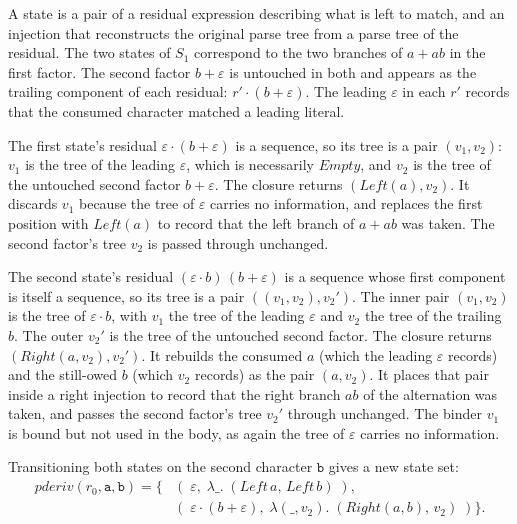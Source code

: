 A state is a pair of a residual expression describing what is left to match,
and an injection that reconstructs the original parse tree 
from a parse tree of the residual.
The two states of $S_1$ correspond to the two branches 
of $a + ab$ in the first factor. 
The second factor $b + \varepsilon$ is untouched in both 
and appears as the trailing component of each residual: $r' \cdot (b + \varepsilon)$.
The leading $\varepsilon$ in each $r'$ records  
that the consumed character matched a leading literal.

The first state's residual $\varepsilon \cdot (b + \varepsilon)$ is a sequence, 
so its tree is a pair $(v_1, v_2)$: 
$v_1$ is the tree of the leading $\varepsilon$, 
which is necessarily $\mathit{Empty}$, 
and $v_2$ is the tree of the untouched second factor $b + \varepsilon$. 
The closure returns $(\mathit{Left}(a), v_2)$. 
It discards $v_1$ because the tree of $\varepsilon$ carries no information, 
and replaces the first position with $\mathit{Left}(a)$ 
to record that the left branch of $a + ab$ was taken. 
The second factor's tree $v_2$ is passed through unchanged.

The second state's residual $(\varepsilon \cdot b)\,(b + \varepsilon)$
is a sequence whose first component is itself a sequence, 
so its tree is a pair $((v_1, v_2), v_2')$. 
The inner pair $(v_1, v_2)$ is the tree of $\varepsilon \cdot b$, 
with $v_1$ the tree of the leading $\varepsilon$ 
and $v_2$ the tree of the trailing $b$. 
The outer $v_2'$ is the tree of the untouched second factor. 
The closure returns $(\mathit{Right}(a, v_2), v_2')$. 
It rebuilds the consumed $a$ (which the leading $\varepsilon$ records) 
and the still-owed $b$ (which $v_2$ records) as the pair $(a, v_2)$.
It places that pair inside a right injection to record 
that the right branch $ab$ of the alternation was taken, 
and passes the second factor's tree $v_2'$ through unchanged. 
The binder $v_1$ is bound but not used in the body, 
as again the tree of $\varepsilon$ carries no information.

%

Transitioning both states on the second character $\mathtt{b}$ gives a new
state set:
\begin{equation}\label{eq:pderiv-std-step2}
\begin{aligned}
\mathit{pderiv}(r_0, \mathtt{a}, \mathtt{b}) =
  \bigl\{
    &(\;\varepsilon,\;
       \lambda \_.\; (\mathit{Left}\,a,\, \mathit{Left}\,b)\;), \\[2pt]
    &(\;\varepsilon \cdot (b + \varepsilon),\;
       \lambda(\_, v_2).\; (\mathit{Right}(a,b),\, v_2)\;)
  \bigr\}.
\end{aligned}
\end{equation}

